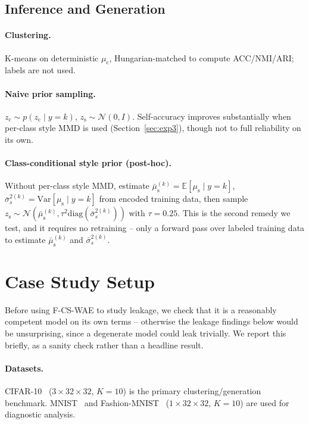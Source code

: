 \documentclass[10pt,letterpaper]{article}
\newcommand{\ours}{F-CS-WAE}
\newcommand{\zc}{z_{\mathrm{c}}}
\newcommand{\zs}{z_{\mathrm{s}}}
\newcommand{\muc}{\mu_{\mathrm{c}}}
\newcommand{\mus}{\mu_{\mathrm{s}}}
\newcommand{\diag}{\mathrm{diag}}
\begin{document}
\subsection{Inference and Generation}

\paragraph{Clustering.} K-means on deterministic $\muc$, Hungarian-matched
to compute ACC/NMI/ARI; labels are not used.

\paragraph{Naive prior sampling.} $\zc\sim p(\zc\mid y{=}k)$,
$\zs\sim\mathcal{N}(0,I)$. Self-accuracy improves substantially when
per-class style MMD is used (Section~\ref{sec:exp3}), though not to full
reliability on its own.

\paragraph{Class-conditional style prior (post-hoc).} Without per-class
style MMD, estimate $\bar\mus^{(k)}=\mathbb{E}[\mus\mid y{=}k]$,
$\bar\sigma_s^{2(k)}=\mathrm{Var}[\mus\mid y{=}k]$ from encoded training
data, then sample $\zs\sim\mathcal{N}(\bar\mus^{(k)},\tau^2\diag(\bar\sigma_s^{2(k)}))$
with $\tau=0.25$. This is the second remedy we test, and it requires no
retraining -- only a forward pass over labeled training data to estimate
$\bar\mus^{(k)}$ and $\bar\sigma_s^{2(k)}$.

\section{Case Study Setup}
\label{sec:cifar10-setup}

Before using \ours{} to study leakage, we check that it is a reasonably
competent model on its own terms -- otherwise the leakage findings below
would be unsurprising, since a degenerate model could leak trivially. We
report this briefly, as a sanity check rather than a headline result.

\paragraph{Datasets.} CIFAR-10~\citep{krizhevsky2009learning}
($3{\times}32{\times}32$, $K{=}10$) is the primary clustering/generation
benchmark. MNIST~\citep{lecun1998gradient} and
Fashion-MNIST~\citep{xiao2017fashion} ($1{\times}32{\times}32$, $K{=}10$)
are used for diagnostic analysis.
\end{document}
